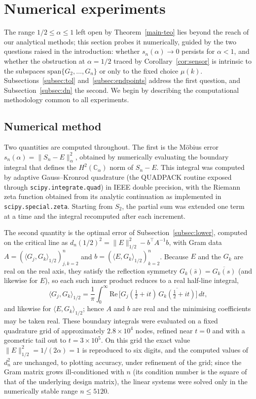 \documentclass[11pt]{extarticle}
\numberwithin{equation}{section}
\theoremstyle{plain}
\theoremstyle{definition}
\begin{document}
\section{Numerical experiments}

The range $1/2 \leq \alpha \leq 1$ left open by Theorem~\ref{main-teo} lies beyond
the reach of our analytical methods; this section probes it numerically, guided
by the two questions raised in the introduction: whether $s_n(\alpha) \to 0$
persists for $\alpha < 1$, and whether the obstruction at $\alpha = 1/2$ traced by
Corollary~\ref{cor:sensor} is intrinsic to the subspaces $\mathrm{span}\{G_2, \dots, G_n\}$
or only to the fixed choice $\mu(k)$. Subsections~\ref{subsec:tol}
and~\ref{subsec:endpoints} address the first question, and
Subsection~\ref{subsec:dn} the second. We
begin by describing the computational methodology common to all experiments.

\subsection{Numerical method}\label{subsec:method}

Two quantities are computed throughout. The first is the M\"obius error
$s_n(\alpha) = \|S_n - E\|^2_\alpha$, obtained by numerically evaluating the boundary
integral that defines the $H^2(\mathbb{C}_\alpha)$ norm of $S_n - E$. This
integral was computed by adaptive Gauss--Kronrod quadrature (the QUADPACK
routine exposed through \texttt{scipy.integrate.quad}) in IEEE double precision,
with the Riemann zeta function obtained from its analytic continuation as
implemented in \texttt{scipy.special.zeta}. Starting from $S_2$, the partial sum
was extended one term at a time and the integral recomputed after each
increment.

The second quantity is the optimal error of Subsection~\ref{subsec:lower},
computed on the critical line as
$d_n(1/2)^2 = \|E\|^2_{1/2} - b^{\top} A^{-1} b$, with Gram data
$A = (\langle G_j, G_k \rangle_{1/2})_{j,k=2}^{n}$ and
$b = (\langle E, G_k \rangle_{1/2})_{k=2}^{n}$. Because $E$ and the $G_k$ are
real on the real axis, they satisfy the reflection symmetry
$G_k(\bar s) = \overline{G_k(s)}$ (and likewise for $E$), so each such inner
product reduces to a real half-line integral,
\[
\langle G_j, G_k \rangle_{1/2}
= \frac{1}{\pi} \int_0^\infty \mathrm{Re}\,\bigl[G_j(\tfrac12+it)\,\overline{G_k(\tfrac12+it)}\bigr]\,dt,
\]
and likewise for $\langle E, G_k \rangle_{1/2}$; hence $A$ and $b$ are real and the
minimising coefficients may be taken real. These
boundary integrals were evaluated on a fixed quadrature grid of approximately
$2.8 \times 10^4$ nodes, refined near $t = 0$ and with a geometric tail out to
$t = 3 \times 10^5$. On this grid the exact value $\|E\|^2_{1/2} = 1/(2\alpha) = 1$
is reproduced to six digits, and the computed values of $d_n^2$ are unchanged, to
plotting accuracy, under refinement of the grid; since the Gram matrix grows
ill-conditioned with $n$ (its condition number is the square of that of the
underlying design matrix), the linear systems were solved only in the numerically
stable range $n \leq 5120$.
\end{document}
